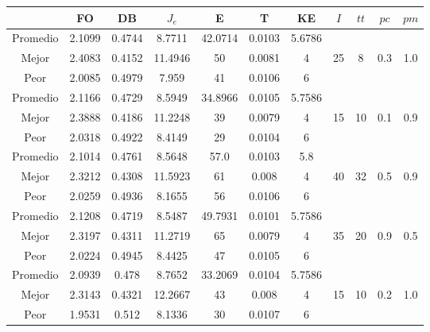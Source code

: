 \begin{table}[h!]
    \footnotesize
    \begin{center}
        \begin{tabular}{|c|c|c|c|c|c|c|c|c|c|c|}
        \hline
             & {\bf FO} & {\bf DB} & $J_e$ & {\bf E} & {\bf T} & {\bf KE} & $I$ & $tt$ & $pc$ & $pm$ \\
        \hline
        \hline
            Promedio  & 2.1099 & 0.4744 & 8.7711 & 42.0714 & 0.0103 & 5.6786 &  &  &  & \\
            \cline{1-7}
            Mejor & 2.4083 & 0.4152  & 11.4946 & 50 & 0.0081 & 4 & 25 & 8 & 0.3 & 1.0\\
            \cline{1-7}
            Peor & 2.0085 & 0.4979  & 7.959 & 41 & 0.0106 & 6 &  &  &  & \\
        \hline
        \hline
            Promedio  & 2.1166 & 0.4729 & 8.5949 & 34.8966 & 0.0105 & 5.7586 &  &  &  & \\
            \cline{1-7}
            Mejor & 2.3888 & 0.4186  & 11.2248 & 39 & 0.0079 & 4 & 15 & 10 & 0.1 & 0.9\\
            \cline{1-7}
            Peor & 2.0318 & 0.4922  & 8.4149 & 29 & 0.0104 & 6 &  &  &  & \\
        \hline
        \hline
            Promedio  & 2.1014 & 0.4761 & 8.5648 & 57.0 & 0.0103 & 5.8 &  &  &  & \\
            \cline{1-7}
            Mejor & 2.3212 & 0.4308  & 11.5923 & 61 & 0.008 & 4 & 40 & 32 & 0.5 & 0.9\\
            \cline{1-7}
            Peor & 2.0259 & 0.4936  & 8.1655 & 56 & 0.0106 & 6 &  &  &  & \\
        \hline
        \hline
            Promedio  & 2.1208 & 0.4719 & 8.5487 & 49.7931 & 0.0101 & 5.7586 &  &  &  & \\
            \cline{1-7}
            Mejor & 2.3197 & 0.4311  & 11.2719 & 65 & 0.0079 & 4 & 35 & 20 & 0.9 & 0.5\\
            \cline{1-7}
            Peor & 2.0224 & 0.4945  & 8.4425 & 47 & 0.0105 & 6 &  &  &  & \\
        \hline
        \hline
            Promedio  & 2.0939 & 0.478 & 8.7652 & 33.2069 & 0.0104 & 5.7586 &  &  &  & \\
            \cline{1-7}
            Mejor & 2.3143 & 0.4321  & 12.2667 & 43 & 0.008 & 4 & 15 & 10 & 0.2 & 1.0\\
            \cline{1-7}
            Peor & 1.9531 & 0.512  & 8.1336 & 30 & 0.0107 & 6 &  &  &  & \\

\end{tabular}
\end{center}
\end{table}
